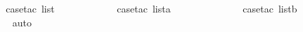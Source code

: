 \begin{isabellebody}
\ {}\isanewline
\ \ \ \isamarkupfalse%
\ {\isacharparenleft}case{\isacharunderscore}tac\ list{\isacharparenright}\isanewline
\ \ \ \ \isamarkupfalse%
\ {}\isanewline
\ \ \ \ \isamarkupfalse%
\ {\isacharparenleft}case{\isacharunderscore}tac\ lista{\isacharparenright}\isanewline
\ \ \ \ \ \isamarkupfalse%
\ {}\isanewline
\ \ \ \ \ \isamarkupfalse%
\ {\isacharparenleft}case{\isacharunderscore}tac\ listb{\isacharparenright}\isanewline
\ \ \ \ \ \ \isamarkupfalse%
\ auto\isanewline
\ \ \isamarkupfalse%
%
\endisatagproof
{\isafoldproof}%
%
\isadelimproof
\isanewline
%
\endisadelimproof
\isanewline
%
\isadelimtheory
\isanewline
%
\endisadelimtheory
%
\isatagtheory
{}\isamarkupfalse%
%
\endisatagtheory
{\isafoldtheory}%
%
\isadelimtheory
%
\endisadelimtheory
%
\end{isabellebody}%

